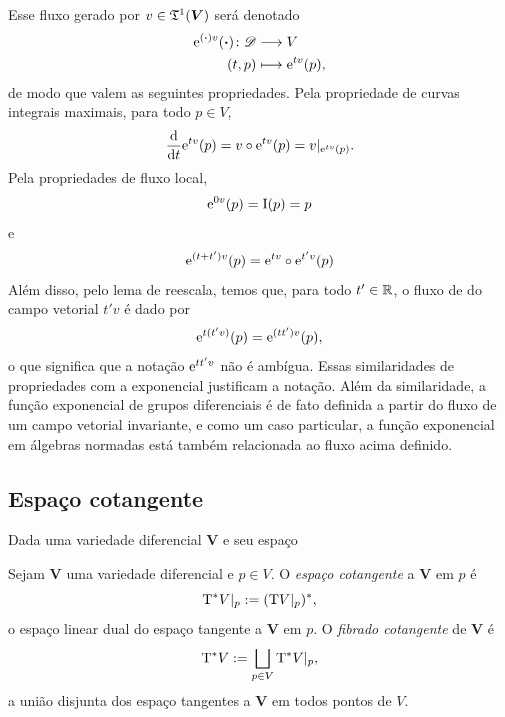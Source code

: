 Esse fluxo gerado por $v \in \mathfrak{T}^1(\bm V)$ será denotado
	\begin{align*}
	{\mathrm{e}^{(\bm{\cdot})v}(\bm{\cdot})}\colon {\mathscr{D}} &\longrightarrow {V} \\{(t,p)} &\longmapsto \mathrm{e}^{tv}(p),
	\end{align*}
de modo que valem as seguintes propriedades. Pela propriedade de curvas integrais maximais, para todo $p \in V$,
	\begin{equation*}
	\frac{\mathrm{d}}{\mathrm{d} t} \mathrm{e}^{tv}(p) = v \circ \mathrm{e}^{tv}(p) = v|_{\mathrm{e}^{tv}(p)}.
	\end{equation*}
Pela propriedades de fluxo local,
	\begin{equation*}
	\mathrm{e}^{0v}(p) = \mathrm{I}(p) = p
	\end{equation*}
e
	\begin{equation*}
	\mathrm{e}^{(t+t')v}(p) = \mathrm{e}^{tv} \circ \mathrm{e}^{t'v}(p)
	\end{equation*}
Além disso, pelo lema de reescala, temos que, para todo $t' \in \mathbb{R}$, o fluxo de do campo vetorial $t'v$ é dado por
	\begin{equation*}
	\mathrm{e}^{t(t'v)}(p) = \mathrm{e}^{(tt')v}(p),
	\end{equation*}
o que significa que a notação $\mathrm{e}^{tt'v}$ não é ambígua. Essas similaridades de propriedades com a exponencial justificam a notação. Além da similaridade, a função exponencial de grupos diferenciais é de fato definida a partir do fluxo de um campo vetorial invariante, e como um caso particular, a função exponencial em álgebras normadas está também relacionada ao fluxo acima definido.

\subsection{Espaço cotangente}

Dada uma variedade diferencial $\bm V$ e seu espaço
\begin{definition}
Sejam $\bm V$ uma variedade diferencial e $p \in V$. O \emph{espaço cotangente} a $\bm V$ em $p$ é
	\begin{equation*}
	\mathrm{T}^* V|_p := (\mathrm{T} V|_p)^*,
	\end{equation*}
o espaço linear dual do espaço tangente a $\bm V$ em $p$. O \emph{fibrado cotangente} de $\bm V$ é
	\begin{equation*}
	\mathrm{T}^* V := \bigsqcup_{p \in V} \mathrm{T}^* V|_p,
	\end{equation*}
a união disjunta dos espaço tangentes a $\bm V$ em todos pontos de $V$.
\end{definition}

